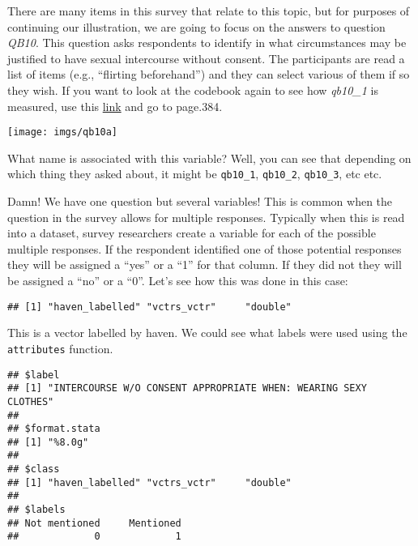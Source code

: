 \documentclass[
]{book}
\newenvironment{Shaded}{\begin{snugshade}}{\end{snugshade}}
\newcommand{\FunctionTok}[1]{\textcolor[rgb]{0.13,0.29,0.53}{\textbf{#1}}}
\newcommand{\NormalTok}[1]{#1}
\newcommand{\SpecialCharTok}[1]{\textcolor[rgb]{0.81,0.36,0.00}{\textbf{#1}}}
\begin{document}
There are many items in this survey that relate to this topic, but for purposes of continuing our illustration, we are going to focus on the answers to question \emph{QB10}. This question asks respondents to identify in what circumstances may be justified to have sexual intercourse without consent. The participants are read a list of items (e.g., ``flirting beforehand'') and they can select various of them if so they wish. If you want to look at the codebook again to see how \emph{qb10\_1} is measured, use this \href{https://www.dropbox.com/s/pvw2ipn45ygm6hm/ZA6695_cdb.pdf?dl=0}{link} and go to page.384.

\texttt{[image: imgs/qb10a]}

What name is associated with this variable? Well, you can see that depending on which thing they asked about, it might be \texttt{qb10\_1}, \texttt{qb10\_2}, \texttt{qb10\_3}, etc etc.

Damn! We have one question but several variables! This is common when the question in the survey allows for multiple responses. Typically when this is read into a dataset, survey researchers create a variable for each of the possible multiple responses. If the respondent identified one of those potential responses they will be assigned a ``yes'' or a ``1'' for that column. If they did not they will be assigned a ``no'' or a ``0''. Let's see how this was done in this case:

\begin{Shaded}
\end{Shaded}

\begin{verbatim}
## [1] "haven_labelled" "vctrs_vctr"     "double"
\end{verbatim}

This is a vector labelled by haven. We could see what labels were used using the \texttt{attributes} function.

\begin{Shaded}
\end{Shaded}

\begin{verbatim}
## $label
## [1] "INTERCOURSE W/O CONSENT APPROPRIATE WHEN: WEARING SEXY CLOTHES"
## 
## $format.stata
## [1] "%8.0g"
## 
## $class
## [1] "haven_labelled" "vctrs_vctr"     "double"        
## 
## $labels
## Not mentioned     Mentioned 
##             0             1
\end{verbatim}
\end{document}
